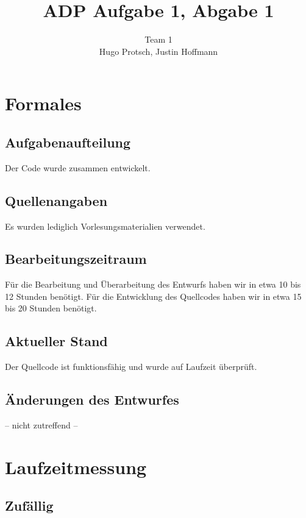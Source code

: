\documentclass[11pt]{article}
\title{ADP Aufgabe 1, Abgabe 1}
\author{Team 1\\Hugo Protsch, Justin Hoffmann}
\begin{document}
    \maketitle


    \section{Formales}\label{sec:Formales}


    \subsection{Aufgabenaufteilung}
    Der Code wurde zusammen entwickelt.

    \subsection{Quellenangaben}

    Es wurden lediglich Vorlesungsmaterialien verwendet.


    \subsection{Bearbeitungszeitraum}
    Für die Bearbeitung und Überarbeitung des Entwurfs haben wir in etwa 10 bis
    12 Stunden benötigt.
    Für die Entwicklung des Quellcodes haben wir in etwa 15 bis 20 Stunden
    benötigt.

    \subsection{Aktueller Stand}
    Der Quellcode ist funktionsfähig und wurde auf Laufzeit überprüft.


    \subsection{Änderungen des Entwurfes}
    -- nicht zutreffend --


    \section{Laufzeitmessung}\label{sec:laufzeitmessung}
    \subsection{Zufällig}\label{subsec:zufaellig}
\end{document}
